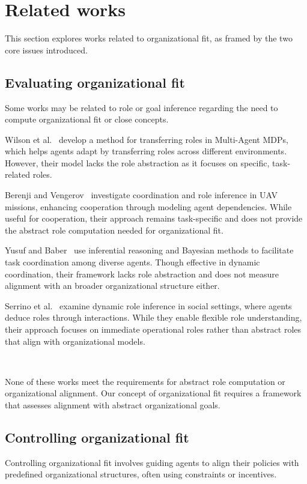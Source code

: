 \documentclass[sigconf,anonymous]{aamas}
\begin{document}
\section{Related works}
\label{sec:related_works}

This section explores works related to organizational fit, as framed by the two core issues introduced.

\subsection{Evaluating organizational fit}

Some works may be related to role or goal inference regarding the need to compute organizational fit or close concepts.

Wilson et al.~\cite{wilson2008learning} develop a method for transferring roles in Multi-Agent MDPs, which helps agents adapt by transferring roles across different environments. However, their model lacks the role abstraction as it focuses on specific, task-related roles.

Berenji and Vengerov~\cite{berenji2000learning} investigate coordination and role inference in UAV missions, enhancing cooperation through modeling agent dependencies. While useful for cooperation, their approach remains task-specific and does not provide the abstract role computation needed for organizational fit.

Yusuf and Baber~\cite{yusuf2020inferential} use inferential reasoning and Bayesian methods to facilitate task coordination among diverse agents. Though effective in dynamic coordination, their framework lacks role abstraction and does not measure alignment with an broader organizational structure either.

Serrino et al.~\cite{serrino2019finding} examine dynamic role inference in social settings, where agents deduce roles through interactions. While they enable flexible role understanding, their approach focuses on immediate operational roles rather than abstract roles that align with organizational models.

\

\noindent None of these works meet the requirements for abstract role computation or organizational alignment. Our concept of organizational fit requires a framework that assesses alignment with abstract organizational goals.

\subsection{Controlling organizational fit}
Controlling organizational fit involves guiding agents to align their policies with predefined organizational structures, often using constraints or incentives.
\end{document}
